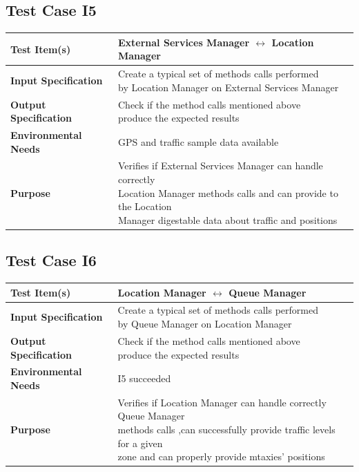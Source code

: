 \documentclass[11pt,titlepage]{article} %
\begin{document}
  \subsection{Test Case I5}
  \begin{table}[H]
    \begin{tabular*}{16cm}{ll}
	\hline
	\textbf{Test Item(s)} & External Services Manager  $ \longleftrightarrow $ Location Manager \\
	\hline
	\textbf{Input Specification} & \pbox{20cm}{Create a typical set of methods calls performed \\ by Location Manager  on  External Services Manager} \\
	\hline
	\textbf{Output Specification} & \pbox{20cm}{Check if the method calls mentioned above \\ produce the expected results}\\
	\hline
	\textbf{Environmental Needs} & GPS and traffic sample data available\\
	\hline
	\textbf{Purpose} & \pbox{20cm}{Verifies if External Services Manager can handle correctly \\ Location Manager methods calls 
					and can provide to the Location \\ Manager digestable data about traffic and positions} \\
	\hline
    \end{tabular*}
  \end{table}
  
  \subsection{Test Case I6}
  \begin{table}[H]
    \begin{tabular*}{16cm}{ll}
	\hline
	\textbf{Test Item(s)} & Location Manager $ \longleftrightarrow $ Queue Manager \\
	\hline
	\textbf{Input Specification} & \pbox{20cm}{Create a typical set of methods calls performed \\ by Queue Manager on Location Manager}\\
	\hline
	\textbf{Output Specification} & \pbox{20cm}{Check if the method calls mentioned above \\ produce the expected results} \\
	\hline
	\textbf{Environmental Needs} & I5 succeeded \\
	\hline
	\textbf{Purpose} & \pbox{20cm}{ Verifies if Location Manager can handle correctly Queue Manager \\ methods calls 
					 ,can successfully provide traffic levels for a given \\ zone and can properly provide mtaxies' positions  } \\
	\hline
    \end{tabular*}
  \end{table}
  
\end{document}
